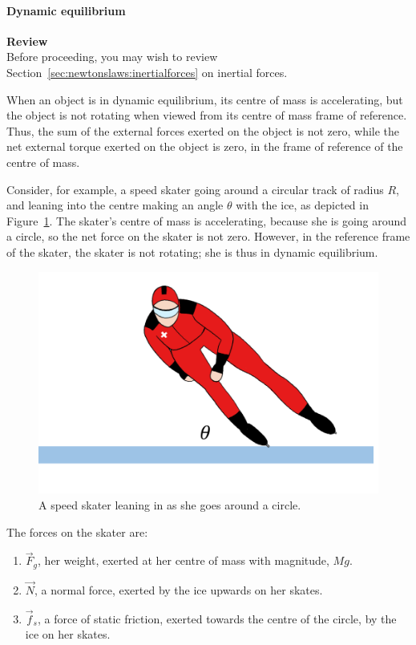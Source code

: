 \paragraph{Dynamic equilibrium}

\begin{framed}
\textbf{Review}\\
Before proceeding, you may wish to review Section~\ref{sec:newtonslaws:inertialforces} on inertial forces.
\end{framed}

When an object is in dynamic equilibrium, its centre of mass is accelerating, but the object is not rotating when viewed from its centre of mass frame of reference. Thus, the sum of the external forces exerted on the object is not zero, while the net external torque exerted on the object is zero, in the frame of reference of the centre of mass.

Consider, for example, a speed skater going around a circular track of radius $R$, and leaning into the centre making an angle $\theta$ with the ice, as depicted in Figure~\ref{fig:rotationaldynamics:skater}. The skater's centre of mass is accelerating, because she is going around a circle, so the net force on the skater is not zero. However, in the reference frame of the skater, the skater is not rotating; she is thus in dynamic equilibrium.

\begin{figure}[!htbp]
\centering
\includegraphics[width=0.625\linewidth]{files/skater-de5ef9789e4b98b933c3d897130ba429.png}
\caption[]{A speed skater leaning in as she goes around a circle.}
\label{fig:rotationaldynamics:skater}
\end{figure}

The forces on the skater are:

\begin{enumerate}
\item $\vec F_g$, her weight, exerted at her centre of mass with magnitude, $Mg$.
\item $\vec N$, a normal force, exerted by the ice upwards on her skates.
\item $\vec f_s$, a force of static friction, exerted towards the centre of the circle, by the ice on her skates.
\end{enumerate}

